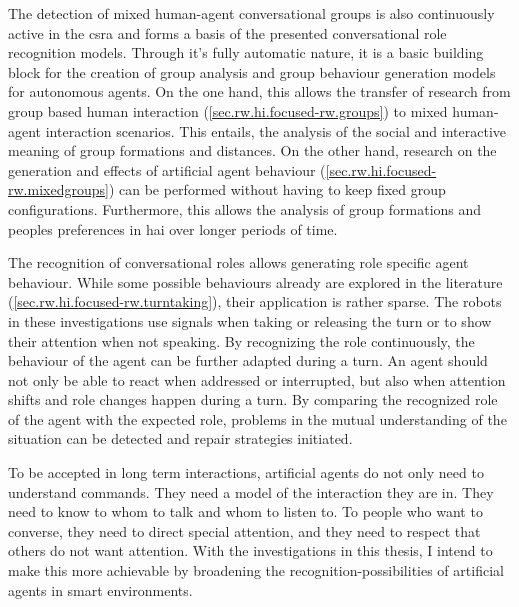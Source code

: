 The detection of mixed human-agent \glspl{conversational group} is also continuously active in the \gls{csra} and forms a basis of the presented \gls{conversational role} recognition models.
Through it's fully automatic nature, it is a basic building block for the creation of group analysis and group behaviour generation models for \glspl{autonomous agent}.
On the one hand, this allows the transfer of research from group based human interaction (\cref{sec.rw.hi.focused-rw.groups}) to mixed human-agent interaction scenarios.
This entails, the analysis of the social and interactive meaning of group formations and distances.
On the other hand, research on the generation and effects of \gls{artificial agent} behaviour (\cref{sec.rw.hi.focused-rw.mixedgroups}) can be performed without having to keep fixed group configurations.
Furthermore, this allows the analysis of group formations and peoples preferences in \gls{hai} over longer periods of time.

The recognition of \glspl{conversational role} allows generating role specific agent behaviour.
While some possible behaviours already are explored in the literature (\cref{sec.rw.hi.focused-rw.turntaking}), their application is rather sparse.
The \glspl{robot} in these investigations use  signals when taking or releasing the \gls{turn} or to show their attention when not speaking.
By recognizing the role continuously, the behaviour of the agent can be further adapted during a \gls{turn}.
An agent should not only be able to react when addressed or interrupted, but also when attention shifts and role changes happen during a \gls{turn}.
By comparing the recognized role of the agent with the expected role, problems in the mutual understanding of the situation can be detected and repair strategies initiated.

To be accepted in long term interactions, \glspl{artificial agent} do not only need to understand commands.
They need a model of the interaction they are in.
They need to know to whom to talk and whom to listen to.
To people who want to converse, they need to direct special attention, and they need to respect that others do not want attention.
With the investigations in this thesis, I intend to make this more achievable by broadening the recognition-possibilities of \glspl{artificial agent} in \glspl{smart environment}.
